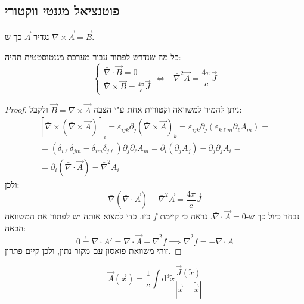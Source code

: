 \documentclass{tstextbook}
\begin{document}
\subsection{פוטנציאל מגנטי ווקטורי}

\begin{definition}
נגדיר \(\vec{A}\) כך ש-\(\bar{\nabla} \times \vec{A}=\vec{B}\).

\end{definition}
\begin{proposition}
כל מה שנדרש לפתור עבור מערכת מגנטוסטטית תהיה:
$$\begin{cases} \bar{\nabla} \cdot \vec{B}=0 \\\bar{\nabla} \times \vec{B} = \frac{4\pi}{c}\vec{J}\end{cases}
\iff -\bar{\nabla}^2 \vec{A}=\frac{4\pi}{c}\vec{J}$$

\end{proposition}
\begin{proof}
ניתן להמיר למשוואה וקטורית אחת ע"י הצבה \(\vec{B} = \bar{\nabla} \times \vec{A}\) ולקבל:
\begin{gather*}\left[ \bar{\nabla} \times \left( \bar{\nabla} \times \vec{A} \right) \right]_{i}=\varepsilon_{ijk}\partial_{j}\left( \bar{\nabla} \times \vec{A} \right)_{k}=\varepsilon_{ijk}\partial_{j}\left( \varepsilon_{k\ell m}\partial_{\ell} A_{m} \right)= \\=\left( \delta_{i\ell} \delta_{jm} - \delta_{im}\delta_{j\ell} \right) \partial_{j}\partial_{\ell} A_{m}=\partial_{i}\left( \partial_{j}A_{j} \right)-\partial_{j}\partial_{j}A_{i}= \\=\partial_{i}\left( \bar{\nabla} \cdot \vec{A} \right)-\bar{\nabla}^2 A_{i}
\end{gather*}
ולכן:
$$\bar{\nabla} \left( \bar{\nabla} \cdot \vec{A} \right)-\bar{\nabla}^2 \vec{A}=\frac{4\pi}{c}\vec{J}$$
נבחר כיול כך ש-\(\bar{\nabla} \cdot \vec{A}=0\). נראה כי קיימת \(f\) כזו. כדי למצוא אותה יש לפתור את המשוואה הבאה:
$$0\overset{!}{=} \bar{\nabla} \cdot A'=\bar{\nabla} \cdot \vec{A}+\bar{\nabla}^2 f\implies \bar{\nabla}^2 f=-\bar{\nabla} \cdot A$$
זוהי משוואת פואסון עם מקור נתון, ולכן קיים פתרון.

\end{proof}
\begin{proposition}
$$\vec{A}\left( \vec{x} \right)=\frac{1}{c}\int\mathrm{d}^3\tilde{x}  \frac{\vec{J}\left( \tilde{x} \right)}{\left\lvert  \vec{x}-\tilde{\vec{x}}  \right\rvert }$$

\end{proposition}
\end{document}
